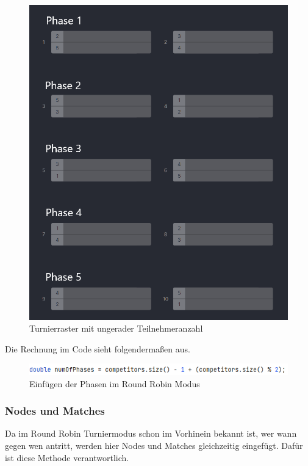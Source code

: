 \begin{figure}[H]
    \includegraphics[scale=0.5]{pics/backend/roundrobin/roundrobin_grid_uneven.png}
    \caption{Turnierraster mit ungerader Teilnehmeranzahl\cite{implementation-execution-1}}
\end{figure}

Die Rechnung im Code sieht folgendermaßen aus.

\begin{figure}[H]
    \includegraphics[scale=1]{pics/backend/roundrobin/roundrobin_insertPhases.png}
    \caption{Einfügen der Phasen im Round Robin Modus}
\end{figure}

\subsubsection{Nodes und Matches}

Da im Round Robin Turniermodus schon im Vorhinein bekannt ist, wer wann gegen wen antritt, werden hier Nodes und Matches gleichzeitig eingefügt. Dafür ist diese Methode verantwortlich.

